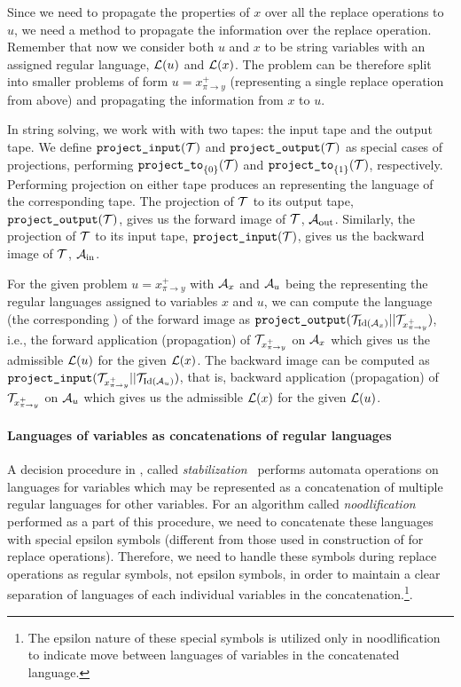 Since we need to propagate the properties of $x$ over all the replace operations to $u$, we need a method to propagate the information over the replace operation.
Remember that now we consider both $u$ and $x$ to be string variables with an assigned regular language, $\mathcal{L}(u)$ and $\mathcal{L}(x)$.
The problem can be therefore split into smaller problems of form $ u = x^{+}_{\pi \rightarrow y}$ (representing a single replace operation from above) and propagating the information from $x$ to $u$.

In string solving, we work with \nfts with two tapes: the input tape and the output tape.
We define $\texttt{project\_input}(\mathcal{T})$ and $\texttt{project\_output}(\mathcal{T})$ as special cases of projections, performing $\texttt{project\_to}_{\{ 0 \}}(\mathcal{T})$ and $\texttt{project\_to}_{\{ 1 \}}(\mathcal{T})$, respectively.
Performing projection on either tape produces an \nfa representing the language of the corresponding tape.
The projection of \nft $\mathcal{T}$ to its output tape, $\texttt{project\_output}(\mathcal{T})$, gives us the forward image of $\mathcal{T}$, \nfa $\mathcal{A}_{\text{out}}$.
Similarly, the projection of \nft $\mathcal{T}$ to its input tape, $\texttt{project\_input}(\mathcal{T})$, gives us the backward image of $\mathcal{T}$, \nfa $\mathcal{A}_{\text{in}}$.

For the given problem $ u = x^{+}_{\pi \rightarrow y}$ with $\mathcal{A}_x$ and $\mathcal{A}_u$ being the \nfas representing the regular languages assigned to variables $x$ and $u$, we can compute the language (the corresponding \nfa) of the forward image as $\texttt{project\_output}(\mathcal{T}_{\text{Id}(\mathcal{A}_x)} || \mathcal{T}_{x^+_{\pi \rightarrow y}})$, i.e., the forward application (propagation) of $\mathcal{T}_{x^+_{\pi \rightarrow y}}$ on $\mathcal{A}_x$ which gives us the admissible $\mathcal{L}(u)$ for the given $\mathcal{L}(x)$.
The backward image can be computed as $\texttt{project\_input}(\mathcal{T}_{x^+_{\pi \rightarrow y}} || \mathcal{T}_{\text{Id}(\mathcal{A}_u)})$, that is, backward application (propagation) of $\mathcal{T}_{x^+_{\pi \rightarrow y}}$ on $\mathcal{A}_u$ which gives us the admissible $\mathcal{L}(x)$ for the given $\mathcal{L}(u)$.

\paragraph{Languages of variables as concatenations of regular languages}
A decision procedure in \noodler, called \emph{stabilization}~\cite{oopsla23_stabilization_DBLP:journals/pacmpl/ChenCHHLS23}
performs automata operations on languages for variables which may be represented as a concatenation of multiple regular languages for other variables.
For an algorithm called \emph{noodlification} performed as a part of this procedure, we need to concatenate these languages with special epsilon symbols (different from those used in construction of \nfts for replace operations).
Therefore, we need to handle these symbols during replace operations as regular symbols, not epsilon symbols, in order to maintain a clear separation of languages of each individual variables in the concatenation.\footnote{The epsilon nature of these special symbols is utilized only in noodlification to indicate move between languages of variables in the concatenated language.}.

